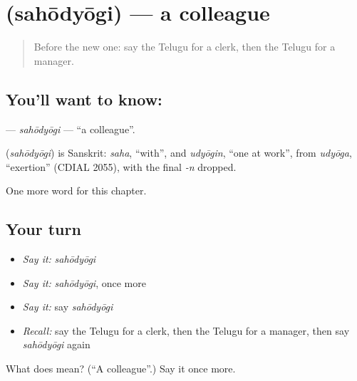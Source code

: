 \section[\texorpdfstring{\te{సహోద్యోగి} (sahōdyōgi)}{సహోద్యోగి (sahōdyōgi)}]{ (sahōdyōgi) — a colleague}

\label{lesson:TE-C195-sahodyogi}



\begin{quote}
Before the new one: say the Telugu for a clerk, then the Telugu for a manager.
\end{quote}

\subsection*{You'll want to know: }
\textbf{} — \emph{sahōdyōgi} — \textquotedblleft{}a colleague\textquotedblright{}.

\begin{cousinweb}
\textbf{} (\emph{sahōdyōgi}) is Sanskrit: \emph{saha}, \textquotedblleft{}with\textquotedblright{}, and \emph{udyōgin}, \textquotedblleft{}one at work\textquotedblright{}, from \emph{udyōga}, \textquotedblleft{}exertion\textquotedblright{} (CDIAL 2055), with the final \emph{-n} dropped.
\end{cousinweb}

\begin{grammarlens}[title={What you've built}]
One more word for this chapter.
\end{grammarlens}

\subsection*{Your turn}
\begin{itemize}
\raggedright
  \item \emph{Say it:} \emph{sahōdyōgi}
  \item \emph{Say it:} \emph{sahōdyōgi}, once more
  \item \emph{Say it:} say \emph{sahōdyōgi}
  \item \emph{Recall:} say the Telugu for a clerk, then the Telugu for a manager, then say \emph{sahōdyōgi} again
\end{itemize}

\begin{tcolorbox}[breakable,colback=teal!4,colframe=teal!35!black,title={Before you move on}]
What does  mean? (\textquotedblleft{}A colleague\textquotedblright{}.) Say it once more.
\end{tcolorbox}
